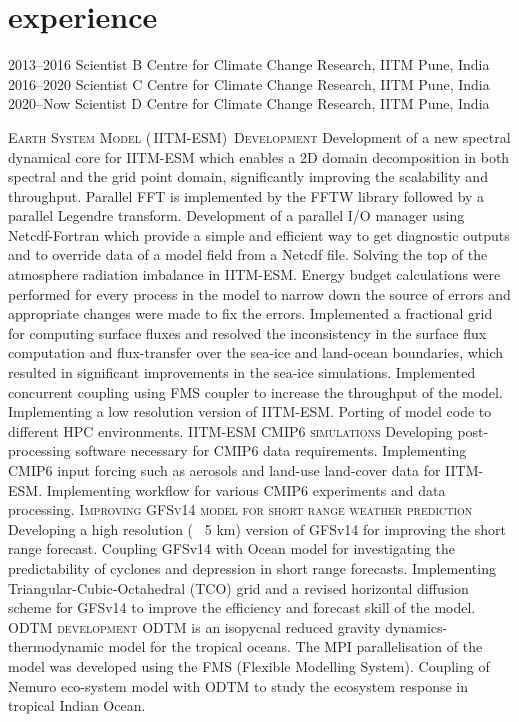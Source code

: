 \documentclass[]{cv-style}          %
\begin{document}
\section{experience}
\begin{exprlist}
  \expr
  {2013--2016}
  {Scientist B}
  {Centre for Climate Change Research, IITM Pune, India}
  \expr
  {2016--2020}
  {Scientist C}
  {Centre for Climate Change Research, IITM Pune, India}
  \expr
  {2020--Now}
  {Scientist D}
  {Centre for Climate Change Research, IITM Pune, India}
\end{exprlist}
\begin{outline}
    \1 \textsc{Earth System Model (\,IITM-ESM)\, Development}
        \2 Development of a new spectral dynamical core for IITM-ESM which enables a 2D domain decomposition in both spectral and the grid point domain, significantly improving the scalability and throughput. Parallel FFT is implemented by the FFTW library followed by a parallel Legendre transform.
        \2 Development of a parallel I/O manager using Netcdf-Fortran which provide a simple and efficient way to get diagnostic outputs and to override data of a model field from a Netcdf file.
        \2 Solving the top of the atmosphere radiation imbalance in IITM-ESM. Energy budget calculations were performed for every process in the model to narrow down the source of errors and appropriate changes were made to fix the errors.
        \2 Implemented a fractional grid for computing surface fluxes and resolved the inconsistency in the surface flux computation and flux-transfer over the sea-ice and land-ocean boundaries, which resulted in significant improvements in the sea-ice simulations.
        \2 Implemented concurrent coupling using FMS coupler to increase the throughput of the model.
        \2 Implementing a low resolution version of IITM-ESM.
        \2 Porting of model code to different HPC environments.
    \1 \textsc{IITM-ESM CMIP6 simulations}
        \2 Developing post-processing software necessary for CMIP6 data requirements.
        \2 Implementing CMIP6 input forcing such as aerosols and land-use land-cover data for IITM-ESM.
        \2 Implementing workflow for various CMIP6 experiments and data processing.
    \1 \textsc{Improving GFSv14 model for short range weather prediction}
        \2 Developing a high resolution (~ 5 km) version of GFSv14 for improving the short range forecast.
        \2 Coupling GFSv14 with Ocean model for investigating the predictability of cyclones and depression in short range forecasts.
        \2 Implementing Triangular-Cubic-Octahedral (TCO) grid and a revised horizontal diffusion scheme for GFSv14 to improve the efficiency and forecast skill of the model.
    \1 \textsc{ODTM development}
        \2 ODTM is an isopycnal reduced gravity dynamics-thermodynamic model for the tropical oceans. The MPI parallelisation of the model was developed using the FMS (Flexible Modelling System).
        \2 Coupling of Nemuro eco-system model with ODTM to study the ecosystem response in tropical Indian Ocean.
    

\end{outline}
\end{document}

